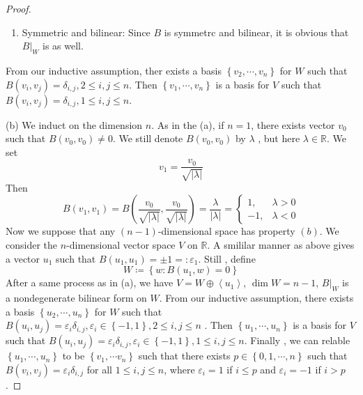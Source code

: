 \documentclass[../main.tex]{subfiles}
\begin{document}
\begin{proof}
\begin{enumerate}
\[     B\left( w_0,v \right) = k_1B\left( w_0,v_1 \right)+ k_2B\left( w_0,w_1 \right)= 0+ 0= 0  
     \]   Since \(  B  \) is nondegenerate, \(  w_0= 0  \). Therefore \(  B|_{W}  \) is nondegenerate.
     \item Symmetric and bilinear: Since \(  B  \) is symmetrc and bilinear, it is obvious that \(  B|_{W}  \) is as well.     
    \end{enumerate}
     From our inductive assumption, ther exists a basis \(  \left\{ v_2,\cdots ,v_{n} \right\}  \) for \(  W  \) such that \(  B\left( v_{i},v_{j} \right)=  \delta _{i,j}, 2\le i,j\le n   \). Then \(  \left\{  v_1,\cdots,v_n  \right\}   \) is a basis for \(  V  \) such that \(  B\left( v_{i},v_{j} \right)=  \delta _{i,j},1\le i,j\le n   \).      

     \item(b) We induct on the dimension \(  n  \). As in the (a), if \(  n = 1  \), there exists vector \(  v_0   \) such that \(  B\left( v_0,v_0 \right)\neq 0   \). We still denote \(  B\left( v_0,v_0 \right)   \) by \(   \lambda   \) , but here      \(   \lambda \in \mathbb{R}   \). We set \[
     v_1= \frac{v_0 }{\sqrt{\left|  \lambda  \right| } } 
     \]Then  \[
     B\left( v_1,v_1 \right)= B\left( \frac{v_0 }{\sqrt{\left|  \lambda  \right| } }, \frac{v_0 }{\sqrt{\left|  \lambda  \right| } }   \right)= \frac{ \lambda  }{\left|  \lambda  \right|  }= \begin{cases} 1,&  \lambda > 0\\ 
      -1,& \lambda < 0 \end{cases}    
     \]Now we suppose that any \(  \left( n-1 \right)   \)-dimensional space has property \(  \left( b \right)   \). We consider the \(  n  \)-dimensional vector space \(  V  \) on \(  \mathbb{R}   \). A smililar manner as above gives a vector \(u_1 \) such that \(  B\left( u_1,u_1 \right)= \pm 1 = : \varepsilon _{1}  \).    Still , define \[
     W\coloneqq \left\{ w:B\left( u_1 ,w \right)= 0  \right\}
     \]After a same process as in (a), we have \(  V= W\oplus \left<u_1 \right>  \), \(  \operatorname{dim}W= n-1  \), \(  B|_{W}  \) is a nondegenerate bilinear form on \(  W  \).   From our inductive assumption, there exists a basis \(  \left\{ u_2,\cdots ,u_{n} \right\}  \) for \(  W  \) such that \(  B\left( u_{i},u_{j} \right)=  \varepsilon _{i}  \delta _{i,j},  \varepsilon _{i}\in \left\{ -1,1 \right\}, 2\le i,j\le n   \)    . Then \(  \left\{ u_1,\cdots ,u_{n} \right\}  \) is a basis for \(  V  \) such that \(  B\left( u_{i},u_{j} \right)=  \varepsilon _{i} \delta _{i,j},  \varepsilon _{i}\in \left\{ -1,1 \right\}, 1\le i,j\le n   \).  Finally , we can relable \(  \left\{ u_1,\cdots ,u_{n} \right\}  \) to be \(  \left\{ v_1,\cdots v_{n} \right\}  \) such that there exists \(  p \in \left\{ 0,1,\cdots ,n \right\}  \) such that \(  B\left( v_{i},v_{j} \right)=  \varepsilon _{i} \delta _{i,j}   \) for all \(  1\le i,j\le n  \), where \(   \varepsilon _{i}= 1  \) if \(  i\le p  \) and \(   \varepsilon _{i}= -1  \) if \(  i> p  \).         


\end{proof}
\end{document}

